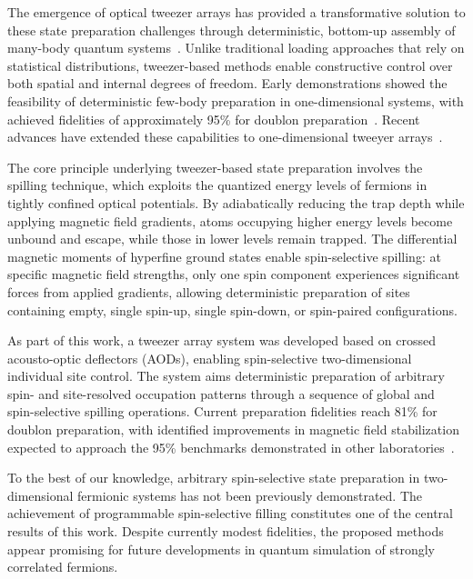 The emergence of optical tweezer arrays has provided a transformative solution to these state preparation challenges through deterministic, bottom-up assembly of many-body quantum systems~\cite{serwane_deterministic_2011}. Unlike traditional loading approaches that rely on statistical distributions, tweezer-based methods enable constructive control over both spatial and internal degrees of freedom. Early demonstrations showed the feasibility of deterministic few-body preparation in one-dimensional systems, with achieved fidelities of approximately 95\% for doublon preparation~\cite{holten_pauli_2022,spar_realization_2022}. Recent advances have extended these capabilities to one-dimensional tweeyer arrays~\cite{stuart_single-atom_2018,gyger_continuous_2024,spar_realization_2022}.

The core principle underlying tweezer-based state preparation involves the spilling technique, which exploits the quantized energy levels of fermions in tightly confined optical potentials. By adiabatically reducing the trap depth while applying magnetic field gradients, atoms occupying higher energy levels become unbound and escape, while those in lower levels remain trapped. The differential magnetic moments of hyperfine ground states enable spin-selective spilling: at specific magnetic field strengths, only one spin component experiences significant forces from applied gradients, allowing deterministic preparation of sites containing empty, single spin-up, single spin-down, or spin-paired configurations.

As part of this work, a tweezer array system was developed based on crossed acousto-optic deflectors (AODs), enabling spin-selective two-dimensional individual site control. The system aims deterministic preparation of arbitrary spin- and site-resolved occupation patterns through a sequence of global and spin-selective spilling operations. Current preparation fidelities reach 81\% for doublon preparation, with identified improvements in magnetic field stabilization expected to approach the 95\% benchmarks demonstrated in other laboratories~\cite{holten_pauli_2022,serwane_deterministic_2011,spar_realization_2022}.

To the best of our knowledge, arbitrary spin-selective state preparation in two-dimensional fermionic systems has not been previously demonstrated. 
The achievement of programmable spin-selective filling constitutes one of the central results of this work. Despite currently modest fidelities, the proposed methods appear promising for future developments in quantum simulation of strongly correlated fermions.

